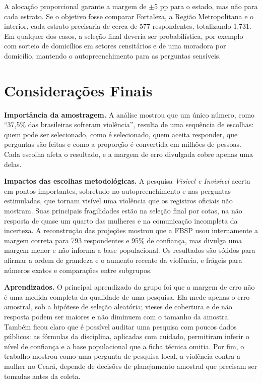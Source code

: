 \documentclass[12pt,a4paper]{article}
\begin{document}
A alocação proporcional garante a margem de $\pm$5 pp para o estado, mas não para cada estrato. Se o objetivo fosse comparar Fortaleza, a Região Metropolitana e o interior, cada estrato precisaria de cerca de 577 respondentes, totalizando 1.731. Em qualquer dos casos, a seleção final deveria ser probabilística, por exemplo com sorteio de domicílios em setores censitários e de uma moradora por domicílio, mantendo o autopreenchimento para as perguntas sensíveis.

\newpage

\section{Considerações Finais}

\textbf{Importância da amostragem.} A análise mostrou que um único número, como ``37,5\% das brasileiras sofreram violência'', resulta de uma sequência de escolhas: quem pode ser selecionado, como é selecionado, quem aceita responder, que perguntas são feitas e como a proporção é convertida em milhões de pessoas. Cada escolha afeta o resultado, e a margem de erro divulgada cobre apenas uma delas.

\textbf{Impactos das escolhas metodológicas.} A pesquisa \textit{Visível e Invisível} acerta em pontos importantes, sobretudo no autopreenchimento e nas perguntas estimuladas, que tornam visível uma violência que os registros oficiais não mostram. Suas principais fragilidades estão na seleção final por cotas, na não resposta de quase um quarto das mulheres e na comunicação incompleta da incerteza. A reconstrução das projeções mostrou que a FBSP usou internamente a margem correta para 793 respondentes e 95\% de confiança, mas divulga uma margem menor e não informa a base populacional. Os resultados são sólidos para afirmar a ordem de grandeza e o aumento recente da violência, e frágeis para números exatos e comparações entre subgrupos.

\textbf{Aprendizados.} O principal aprendizado do grupo foi que a margem de erro não é uma medida completa da qualidade de uma pesquisa. Ela mede apenas o erro amostral, sob a hipótese de seleção aleatória; vieses de cobertura e de não resposta podem ser maiores e não diminuem com o tamanho da amostra. Também ficou claro que é possível auditar uma pesquisa com poucos dados públicos: as fórmulas da disciplina, aplicadas com cuidado, permitiram inferir o nível de confiança e a base populacional que a ficha técnica omitia. Por fim, o trabalho mostrou como uma pergunta de pesquisa local, a violência contra a mulher no Ceará, depende de decisões de planejamento amostral que precisam ser tomadas antes da coleta.
\end{document}
